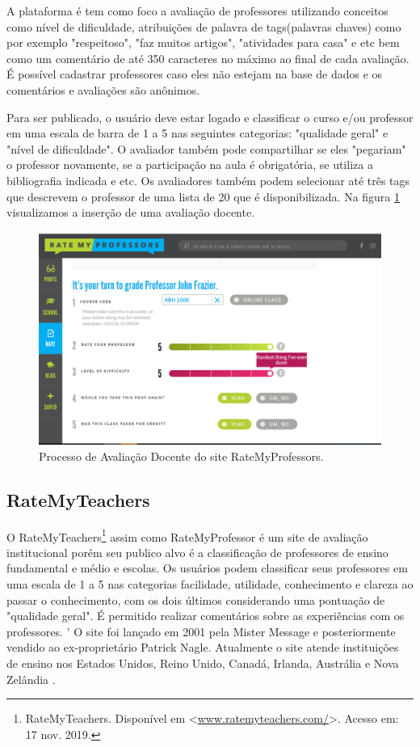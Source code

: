 \documentclass[12pt, a4paper]{report}
\begin{document}
A plataforma é tem como foco a avaliação de professores utilizando conceitos como nível de dificuldade, atribuições de palavra de tags(palavras chaves) como por exemplo "respeitoso", "faz muitos artigos", "atividades para casa" e etc bem como um comentário de até 350 caracteres no máximo ao final de cada avaliação. É possível cadastrar professores caso eles não estejam na base de dados e os comentários e avaliações são anônimos.

Para ser publicado, o usuário deve estar logado e classificar o curso e/ou professor em uma escala de barra de 1 a 5 nas seguintes categorias: "qualidade geral" e "nível de dificuldade". O avaliador também pode compartilhar se eles "pegariam" o professor novamente, se a participação na aula é obrigatória, se utiliza a bibliografia indicada e etc. Os avaliadores também podem selecionar até três tags que descrevem o professor de uma lista de 20 que é disponibilizada. Na figura \ref{fig:ratemyprofessor} visualizamos a inserção de uma avaliação docente.

\begin{figure}
\centering
\includegraphics[scale=0.45]{ratemyprofessor.png}
\caption{Processo de Avaliação Docente do site RateMyProfessors.}
\label{fig:ratemyprofessor}
\end{figure}

\subsection{RateMyTeachers}

O RateMyTeachers\footnote{RateMyTeachers. Disponível em <\url{www.ratemyteachers.com/}>. Acesso em: 17 nov. 2019.} assim como RateMyProfessor é um site de avaliação institucional porém seu publico alvo é a classificação de professores de ensino fundamental e médio e escolas. Os usuários podem classificar seus professores em uma escala de 1 a 5 nas categorias facilidade, utilidade, conhecimento e clareza ao passar o conhecimento, com os dois últimos considerando uma pontuação de "qualidade geral". É permitido realizar comentários sobre as experiências com os professores.
'
O site foi lançado em 2001 pela Mister Message e posteriormente vendido ao ex-proprietário Patrick Nagle. Atualmente o site atende instituições de ensino nos Estados Unidos, Reino Unido, Canadá, Irlanda, Austrália e Nova Zelândia .
\end{document}
